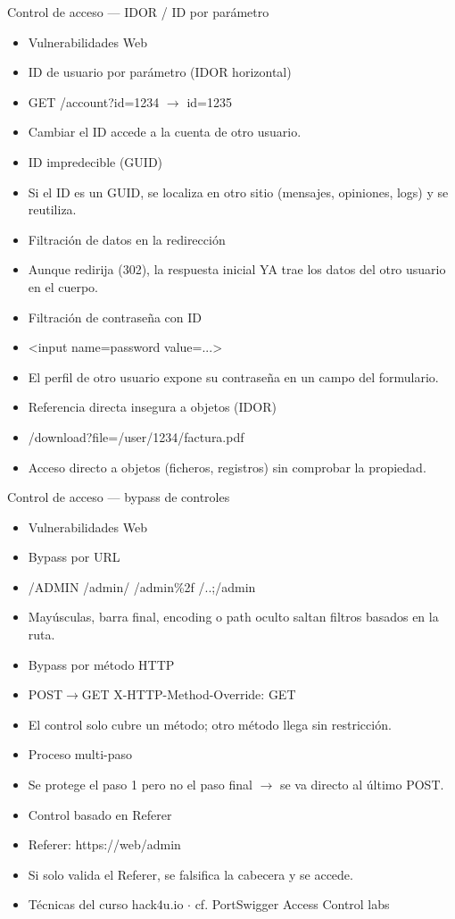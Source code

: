 \documentclass[aspectratio=169,10pt]{beamer}
\begin{document}
\begin{frame}[allowframebreaks]{Control de acceso --- IDOR / ID por parámetro}
\small
  \begin{itemize}
  \item Vulnerabilidades Web
  \item ID de usuario por parámetro (IDOR horizontal)
  \item GET /account?id=1234 $\rightarrow$ id=1235
  \item Cambiar el ID accede a la cuenta de otro usuario.
  \item ID impredecible (GUID)
  \item Si el ID es un GUID, se localiza en otro sitio (mensajes, opiniones, logs) y se reutiliza.
  \item Filtración de datos en la redirección
  \item Aunque redirija (302), la respuesta inicial YA trae los datos del otro usuario en el cuerpo.
  \item Filtración de contraseña con ID
  \item \textless{}input name=\textquotedbl{}password\textquotedbl{} value=\textquotedbl{}...\textquotedbl{}\textgreater{}
  \item El perfil de otro usuario expone su contraseña en un campo del formulario.
  \item Referencia directa insegura a objetos (IDOR)
  \item /download?file=/user/1234/factura.pdf
  \item Acceso directo a objetos (ficheros, registros) sin comprobar la propiedad.
  \end{itemize}
\end{frame}

\begin{frame}[allowframebreaks]{Control de acceso --- bypass de controles}
\small
  \begin{itemize}
  \item Vulnerabilidades Web
  \item Bypass por URL
  \item /ADMIN /admin/ /admin\%2f /..;/admin
  \item Mayúsculas, barra final, encoding o path oculto saltan filtros basados en la ruta.
  \item Bypass por método HTTP
  \item POST$\rightarrow$GET X-HTTP-Method-Override: GET
  \item El control solo cubre un método; otro método llega sin restricción.
  \item Proceso multi-paso
  \item Se protege el paso 1 pero no el paso final $\rightarrow$ se va directo al último POST.
  \item Control basado en Referer
  \item Referer: https://web/admin
  \item Si solo valida el Referer, se falsifica la cabecera y se accede.
  \item Técnicas del curso hack4u.io $\cdot$ cf. PortSwigger Access Control labs
  \end{itemize}
\end{frame}
\end{document}
